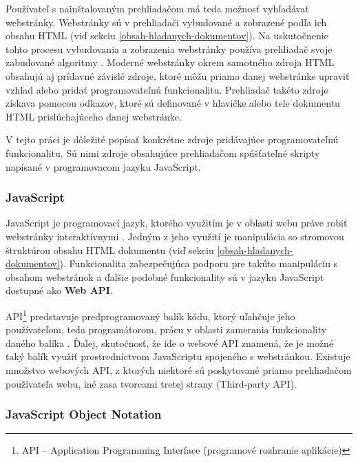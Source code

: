 Používateľ s nainštalovaným prehliadačom má teda možnosť vyhľadávať webstránky.
Webstránky sú v prehliadači vybudované a zobrazené podľa ich obsahu HTML (viď sekciu \ref{obsah-hladanych-dokumentov}).
Na uskutočnenie tohto procesu vybudovania a zobrazenia webstránky používa prehliadač svoje zabudované algoritmy \cite{mdn-docs-how-browser-works}.
Moderné webstránky okrem samotného zdroja HTML obsahujú aj prídavné závislé zdroje, ktoré môžu priamo danej webstránke upraviť vzhľad alebo pridať programovateľnú funkcionalitu.
Prehliadač takéto zdroje získava pomocou odkazov, ktoré sú definované v hlavičke alebo tele dokumentu HTML prislúchajúceho danej webstránke.

V tejto práci je dôležité popísať konkrétne zdroje pridávajúce programovateľnú funkcionalitu.
Sú nimi zdroje obsahujúce prehliadačom spúšťateľné skripty napísané v programovacom jazyku JavaScript.

\subsubsection{JavaScript}
\label{javascript}

JavaScript je programovací jazyk, ktorého využitím je v oblasti webu práve robiť webstránky interaktívnymi \cite{mdn-docs-js}. 
Jedným z jeho využití je manipulácia so stromovou štruktúrou obsahu HTML dokumentu (viď sekciu \ref{obsah-hladanych-dokumentov}).
Funkcionalita zabezpečujúca podporu pre takúto manipuláciu s obsahom webstránok a ďalšie podobné funkcionality sú v jazyku JavaScript dostupné ako \textbf{Web API}.

API\footnote{API -- Application Programming Interface (programové rozhranie aplikácie)} predstavuje predprogramovaný balík kódu, ktorý uľahčuje jeho používateľom, teda programátorom, prácu v oblasti zamerania funkcionality daného balíka \cite{mdn-docs-web-api}.
Ďalej, skutočnosť, že ide o webové API znamená, že je možné taký balík využiť prostredníctvom JavaScriptu spojeného s webstránkou.
Existuje množstvo webových API, z ktorých niektoré sú poskytované priamo prehliadačom používateľa webu, iné zasa tvorcami tretej strany (Third-party API).

\subsubsection{JavaScript Object Notation}
\label{json}

